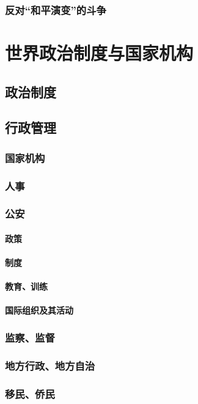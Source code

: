 \documentclass[UTF8]{../RepresentationUniverse}
\begin{document}
    \subsubsection{反对“和平演变”的斗争}

\section{世界政治制度与国家机构}
    \subsection{政治制度}
    \subsection{行政管理}
        \subsubsection{国家机构}
        \subsubsection{人事}
        \subsubsection{公安}
            \paragraph{政策}
            \paragraph{制度}
            \paragraph{教育、训练}
            \paragraph{国际组织及其活动}

        \subsubsection{监察、监督}
        \subsubsection{地方行政、地方自治}
        \subsubsection{移民、侨民}
\end{document}
